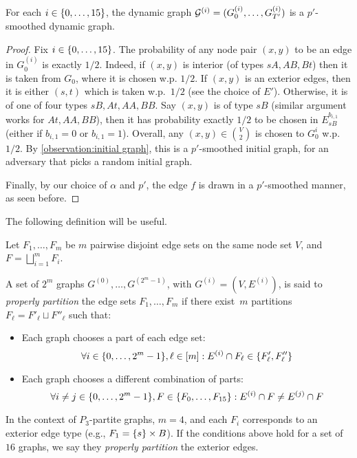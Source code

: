 \documentclass[letter,11pt]{article}
\begin{document}
\begin{claim}
	For each $i\in \{0,\dots, 15\}$, the dynamic graph $\mathcal{G}^{(i)} = (G^{(i)}_0, \dots, G^{(i)}_{T'})$ is a $p'$-smoothed dynamic graph.
\end{claim}

\begin{proof}
    Fix $i\in \{0,\dots, 15\}$.
    The probability of any node pair $(x,y)$ to be an edge in $G^{(i)}_0$ is exactly $1/2$.
    Indeed, if $(x,y)$ is interior (of types $sA, AB, Bt$) then it is taken from $G_0$, where it is chosen w.p. $1/2$.
    If $(x,y)$ is an exterior edges, then it is either $(s,t)$ which is taken w.p.~$1/2$ (see the choice of $E'$).
    Otherwise, it is of one of four types $sB, At, AA, BB$.
    Say $(x,y)$ is of type $sB$ (similar argument works for $At, AA, BB$), then it has probability exactly $1/2$ to be chosen in $E^{b_{i,1}}_{sB}$ (either if $b_{i,1} = 0$ or $b_{i,1} = 1$). 
    Overall, any $(x,y)\in \binom{V}{2}$ is chosen to $G^i_0$ w.p.~$1/2$.
    By \cref{observation:initial graph},
    this is a $p'$-smoothed initial graph, for an adversary that picks a random initial graph.

    Finally, by our choice of $\alpha$ and $p'$, the edge $f$ is drawn in a $p'$-smoothed manner, as seen before.
\end{proof}

The following definition will be useful.
\begin{definition}
	Let $F_1, \dots, F_m$ be 
	$m$ pairwise disjoint edge sets on the same node set $V$, 
	and $F = \bigsqcup_{i=1}^{m} F_i$. 
	
	A set of $2^m$ graphs $G^{(0)}, \dots, G^{(2^m - 1)}$, with $G^{(i)}=(V,E^{(i)})$, 
	is said to \emph{properly partition} the edge sets $F_1, \dots, F_m$ if there exist~$m$ partitions $F_{\ell} = F'_{\ell} \sqcup F''_{\ell}$ such that:
	\begin{itemize}
		\item Each graph chooses a part of each edge set:
		\[
		\forall i\in\{0,\dots,2^m - 1\}, \ell\in[m]: E^{(i)} \cap F_{\ell} \in \{F'_{\ell}, F''_{\ell}\}
		\]
		
		\item Each graph chooses a different combination of parts:
		\[
		\forall i\neq  j\in \{0,\dots,2^m - 1\}, F\in \{F_0,\ldots,F_{15}\}: E^{(i)} \cap F \neq E^{(j)} \cap F
		\]
	\end{itemize}
	
	In the context of $P_3$-partite graphs,  $m=4$, and each $F_i$ corresponds to an exterior edge type (e.g., $F_1 = \{s\} \times B$). 
	If the conditions above hold for a set of $16$ graphs, we say they \emph{properly partition} the exterior edges.  
\end{definition}
\end{document}
